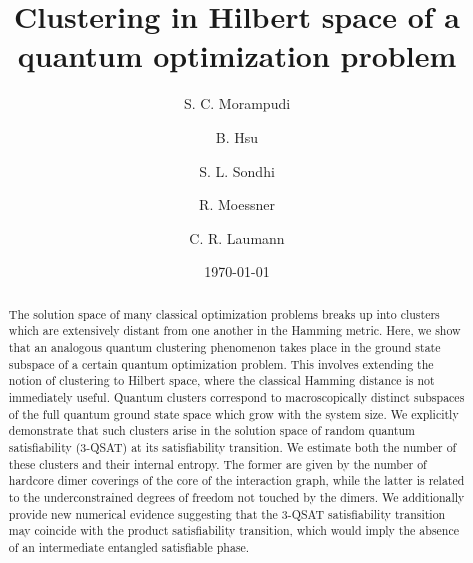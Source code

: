 \documentclass[aps,pra,twocolumn,superscriptaddress,amsmath]{revtex4-1}
\begin{document}

\title{Clustering in Hilbert space of a quantum optimization problem}
	


\author{S. C. Morampudi}


\author{B. Hsu}


\author{S. L. Sondhi}


\author{R. Moessner}

\author{C. R. Laumann}


\date{\today}


\begin{abstract}
The solution space of many classical optimization problems breaks up into  clusters which are extensively distant from one another in the Hamming metric.
%
Here, we show that an analogous quantum clustering phenomenon takes place in the ground state subspace of a certain quantum optimization problem.
%
This involves extending the notion of clustering to Hilbert space, where the classical Hamming distance is not immediately useful. 
%
Quantum clusters correspond to macroscopically distinct subspaces of the full quantum ground state space which grow with the system size.
%
We explicitly demonstrate that such clusters arise in the solution space of random quantum satisfiability (3-QSAT) at its satisfiability transition.
%
We estimate both the number of these clusters and their internal entropy. 
The former are given by the number of hardcore dimer
coverings of the core of the interaction graph, while the latter is related to the underconstrained degrees of freedom not touched by the dimers.
%
We additionally provide new numerical evidence suggesting that the 3-QSAT satisfiability transition may coincide 
with the product satisfiability transition, which would imply the absence of an intermediate entangled satisfiable phase.
\end{abstract}
\end{document}
